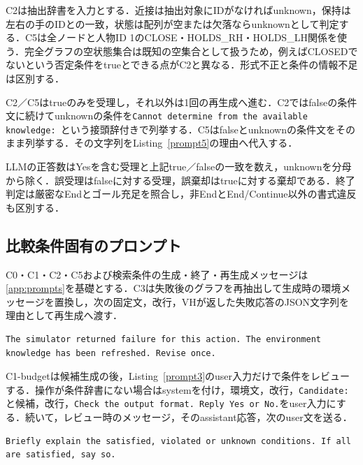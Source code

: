 C2は抽出辞書を入力とする．近接は抽出対象にIDがなければunknown，保持は左右の手のIDとの一致，状態は配列が空または欠落ならunknownとして判定する．C5は全ノードと人物ID 1のCLOSE・HOLDS\_RH・HOLDS\_LH関係を使う．完全グラフの空状態集合は既知の空集合として扱うため，例えばCLOSEDでないという否定条件をtrueとできる点がC2と異なる．形式不正と条件の情報不足は区別する．

C2／C5はtrueのみを受理し，それ以外は1回の再生成へ進む．C2ではfalseの条件文に続けてunknownの条件を\texttt{Cannot determine from the available knowledge: }という接頭辞付きで列挙する．C5はfalseとunknownの条件文をそのまま列挙する．その文字列をListing~\ref{prompt5}の理由へ代入する．

LLMの正答数はYesを含む受理と上記true／falseの一致を数え，unknownを分母から除く．誤受理はfalseに対する受理，誤棄却はtrueに対する棄却である．終了判定は厳密なEndとゴール充足を照合し，非EndとEnd/Continue以外の書式違反も区別する．

\subsection{比較条件固有のプロンプト}\label{app:comparison_prompts}
C0・C1・C2・C5および検索条件の生成・終了・再生成メッセージは\ref{app:prompts}を基礎とする．C3は失敗後のグラフを再抽出して生成時の環境メッセージを置換し，次の固定文，改行，VHが返した失敗応答のJSON文字列を理由として再生成へ渡す．
\begin{lstlisting}[basicstyle=\ttfamily\scriptsize,columns=fullflexible]
The simulator returned failure for this action. The environment knowledge has been refreshed. Revise once.
\end{lstlisting}

C1-budgetは候補生成の後，Listing~\ref{prompt3}のuser入力だけで条件をレビューする．操作が条件辞書にない場合はsystemを付け，環境文，改行，\texttt{Candidate: }と候補，改行，\texttt{Check the output format. Reply Yes or No.}をuser入力にする．続いて，レビュー時のメッセージ，そのassistant応答，次のuser文を送る．
\begin{lstlisting}[basicstyle=\ttfamily\scriptsize,columns=fullflexible]
Briefly explain the satisfied, violated or unknown conditions. If all are satisfied, say so.
\end{lstlisting}


